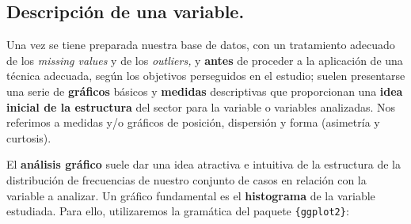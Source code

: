 \documentclass[
]{book}
\newenvironment{Shaded}{\begin{snugshade}}{\end{snugshade}}
\newcommand{\AttributeTok}[1]{\textcolor[rgb]{0.13,0.29,0.53}{#1}}
\newcommand{\DecValTok}[1]{\textcolor[rgb]{0.00,0.00,0.81}{#1}}
\newcommand{\FloatTok}[1]{\textcolor[rgb]{0.00,0.00,0.81}{#1}}
\newcommand{\FunctionTok}[1]{\textcolor[rgb]{0.13,0.29,0.53}{\textbf{#1}}}
\newcommand{\NormalTok}[1]{#1}
\newcommand{\SpecialCharTok}[1]{\textcolor[rgb]{0.81,0.36,0.00}{\textbf{#1}}}
\newcommand{\StringTok}[1]{\textcolor[rgb]{0.31,0.60,0.02}{#1}}
\begin{document}
\subsection{Descripción de una variable.}\label{descripciuxf3n-de-una-variable.}

Una vez se tiene preparada nuestra base de datos, con un tratamiento adecuado de los \emph{missing values} y de los \emph{outliers,} y \textbf{antes} de proceder a la aplicación de una técnica adecuada, según los objetivos perseguidos en el estudio; suelen presentarse una serie de \textbf{gráficos} básicos y \textbf{medidas} descriptivas que proporcionan una \textbf{idea inicial de la estructura} del sector para la variable o variables analizadas. Nos referimos a medidas y/o gráficos de posición, dispersión y forma (asimetría y curtosis).

El \textbf{análisis gráfico} suele dar una idea atractiva e intuitiva de la estructura de la distribución de frecuencias de nuestro conjunto de casos en relación con la variable a analizar. Un gráfico fundamental es el \textbf{histograma} de la variable estudiada. Para ello, utilizaremos la gramática del paquete \texttt{\{ggplot2\}}:

\begin{Shaded}
\end{Shaded}
\end{document}
